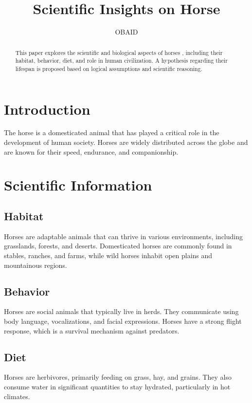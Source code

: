 \documentclass[12pt]{article}
\title{Scientific Insights on Horse }
\author{OBAID}
\date{}
\begin{document}
\maketitle

\begin{abstract}
This paper explores the scientific and biological aspects of horses , including their habitat, behavior, diet, and role in human civilization. A hypothesis regarding their lifespan is proposed based on logical assumptions and scientific reasoning.
\end{abstract}

\section{Introduction}
The horse is a domesticated animal that has played a critical role in the development of human society. Horses are widely distributed across the globe and are known for their speed, endurance, and companionship.

\section{Scientific Information}
\subsection{Habitat}
Horses are adaptable animals that can thrive in various environments, including grasslands, forests, and deserts. Domesticated horses are commonly found in stables, ranches, and farms, while wild horses inhabit open plains and mountainous regions.

\subsection{Behavior}
Horses are social animals that typically live in herds. They communicate using body language, vocalizations, and facial expressions. Horses have a strong flight response, which is a survival mechanism against predators.

\subsection{Diet}
Horses are herbivores, primarily feeding on grass, hay, and grains. They also consume water in significant quantities to stay hydrated, particularly in hot climates.
\end{document}
